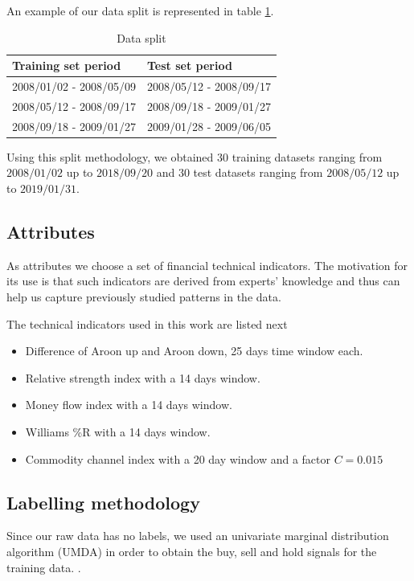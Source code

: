 \documentclass[preprint,3p,twocolumn]{elsarticle}
\begin{document}
An example of our data split is represented in table \ref{table:data split}.

\begin{table}[h]
\centering
\begin{tabular}{ll}
\hline
\textbf{Training set period} & \textbf{Test set period} \\
\hline
2008/01/02 - 2008/05/09 & 2008/05/12 - 2008/09/17 \\
2008/05/12 - 2008/09/17 & 2008/09/18 - 2009/01/27 \\
2008/09/18 - 2009/01/27 & 2009/01/28 - 2009/06/05 \\
\hline
\end{tabular}
\caption{\label{table:data split} Data split}
\end{table}

Using this split methodology, we obtained $30$ training datasets ranging from $2008/01/02$ up to $2018/09/20$ and $30$ test datasets ranging from $2008/05/12$ up to $2019/01/31$.

\subsection{Attributes}
\label{subsec:attributes}
As attributes we choose a set of financial technical indicators. The motivation for its use is that such indicators are derived from experts' knowledge and thus can help us capture previously studied patterns in the data.

The technical indicators used in this work are listed next

\begin{itemize}
\item Difference of Aroon up and Aroon down, 25 days time window each.

\item Relative strength index with a 14 days window.

\item Money flow index with a 14 days window.

\item Williams \%R with a 14 days window.

\item Commodity channel index with a 20 day window and a factor $C = 0.015$
\end{itemize}

\subsection{Labelling methodology}
\label{subsec:labelling}
Since our raw data has no labels, we used an univariate marginal distribution algorithm (UMDA) in order to obtain the buy, sell and hold signals for the training data. \cite{simon2013evolutionary}.
\end{document}
